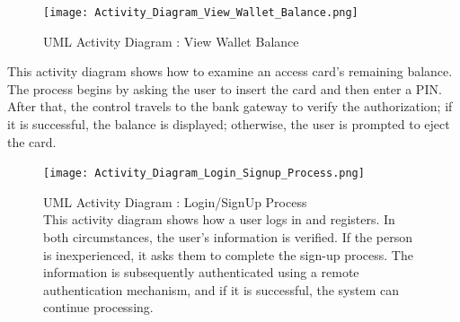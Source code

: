 \documentclass[a4paper, 11pt]{report}
\begin{document}
\begin{figure}[h]
    \centering
    \texttt{[image: Activity\_Diagram\_View\_Wallet\_Balance.png]}
    \caption{UML Activity Diagram : View Wallet Balance\\ 
    }
    \label{fig:Activity Diagram View Wallet Balance}
\end{figure}
\noindent This activity diagram shows how to examine an access card's remaining balance. The process begins by asking the user to insert the card and then enter a PIN. After that, the control travels to the bank gateway to verify the authorization; if it is successful, the balance is displayed; otherwise, the user is prompted to eject the card.
\begin{figure}[h]
    \centering
    \texttt{[image: Activity\_Diagram\_Login\_Signup\_Process.png]}
    \caption{UML Activity Diagram : Login/SignUp Process\\ 
    This activity diagram shows how a user logs in and registers. In both circumstances, the user's information is verified. If the person is inexperienced, it asks them to complete the sign-up process. The information is subsequently authenticated using a remote authentication mechanism, and if it is successful, the system can continue processing.}
    \label{fig:Activity Diagram Login/SignUp Process}
\end{figure}
\end{document}
